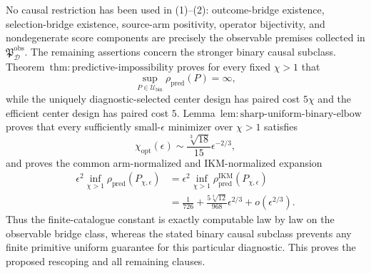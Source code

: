 No causal restriction has been used in (1)--(2): outcome-bridge existence, selection-bridge existence, source-arm positivity, operator bijectivity, and nondegenerate score components are precisely the observable premises collected in \(\mathfrak P_{\mathcal D}^{\mathrm{obs}}\).  The remaining assertions concern the stronger binary causal subclass.  Theorem~\(\mathrm{thm{:}predictive\text{-}impossibility}\) proves for every fixed \(\chi>1\) that
\[
 \sup_{P\in\mathcal U_{\mathrm{bin}}}
 \rho_{\mathrm{pred}}(P)=\infty,
\]
while the uniquely diagnostic-selected center design has paired cost \(5\chi\) and the efficient center design has paired cost \(5\).  Lemma~\(\mathrm{lem{:}sharp\text{-}uniform\text{-}binary\text{-}elbow}\) proves that every sufficiently small-\(\epsilon\) minimizer over \(\chi>1\) satisfies
\[
 \chi_{\mathrm{opt}}(\epsilon)
 \sim\frac{\sqrt[3]{18}}{15}\epsilon^{-2/3},
\]
and proves the common arm-normalized and IKM-normalized expansion
\[
\begin{aligned}
 \epsilon^2\inf_{\chi>1}\rho_{\mathrm{pred}}(P_{\chi,\epsilon})
 &=\epsilon^2\inf_{\chi>1}
   \rho_{\mathrm{pred}}^{\mathrm{IKM}}(P_{\chi,\epsilon})\\
 &=\frac1{726}+\frac{5\sqrt[3]{12}}{968}\epsilon^{2/3}
   +o(\epsilon^{2/3}).
\end{aligned}
\]
Thus the finite-catalogue constant is exactly computable law by law on the observable bridge class, whereas the stated binary causal subclass prevents any finite primitive uniform guarantee for this particular diagnostic.  This proves the proposed rescoping and all remaining clauses.